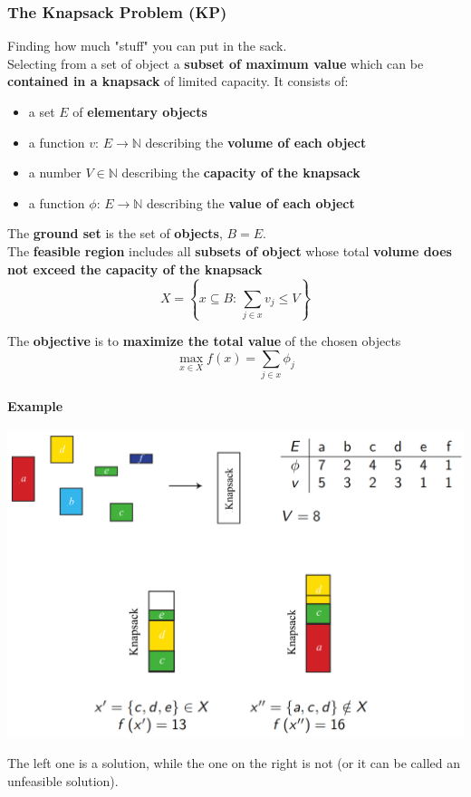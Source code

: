 \documentclass[11pt]{article}
\begin{document}
	\subsubsection{The Knapsack Problem (KP)}
	Finding how much "stuff" you can put in the sack.\\ 
	Selecting from a set of object a \textbf{subset of maximum value} which can be \textbf{contained in a knapsack} of limited capacity. It consists of: 
	\begin{itemize}
		\item a set $E$ of \textbf{elementary objects}
		\item a function $v: \, E \rightarrow \mathbb{N}$ describing the \textbf{volume of each object}
		\item a number $V \in \mathbb{N}$ describing the \textbf{capacity of the knapsack}
		\item a function $\phi : \, E \rightarrow \mathbb{N}$ describing the \textbf{value of each object}
	\end{itemize}
	
	The \textbf{ground set} is the set of \textbf{objects}, $B = E$.\\
	
	The \textbf{feasible region} includes all \textbf{subsets of object} whose total \textbf{volume does not exceed the capacity of the knapsack}
	$$ X = \left\{x \subseteq B : \, \sum_{j \in x} v_j \leq V \right\} $$
	
	The \textbf{objective} is to \textbf{maximize the total value} of the chosen objects
	$$ \max_{x \in X} f(x) = \sum_{j \in x} \phi_j $$
	
	\newpage
	
	\paragraph{Example} 	
	\begin{center}
		\includegraphics[width=\columnwidth]{img/KP1}
	\end{center}
	The left one is a solution, while the one on the right is not (or it can be called an unfeasible solution).
	
\end{document}
